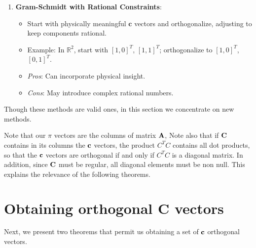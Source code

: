 \begin{enumerate}
\begin{itemize}
            \item \textit{Cons}: Exists only for specific $n - k$ (e.g., 2, 4, 8, \ldots).
        \end{itemize}
    \item \textbf{Gram-Schmidt with Rational Constraints}:
        \begin{itemize}
            \item Start with physically meaningful $\mathbf{c}$ vectors and orthogonalize, adjusting to keep components rational.
            \item Example: In $\mathbb{R}^2$, start with $[1, 0]^T$, $[1, 1]^T$; orthogonalize to $[1, 0]^T$, $[0, 1]^T$.
            \item \textit{Pros}: Can incorporate physical insight.
            \item \textit{Cons}: May introduce complex rational numbers.
        \end{itemize}
\end{enumerate}

Though these methods are valid ones, in this section we concentrate on new methods.

Note that our $\pi$ vectors are the columns of matrix ${\bf A}$, Note also that if ${\bf C}$ contains in its columns the ${\bf c}$ vectors, the product $C^T C$ contains all dot products, so that the ${\bf c}$ vectors are orthogonal if and only if $C^T C$ is a diagonal matrix. In addition, since ${\bf C}$
must be regular, all diagonal elements must be non null.  This explains the relevance of the following theorems.

\section{Obtaining orthogonal C vectors}
Next, we present two theorems that permit us obtaining a set of ${\bf c}$ orthogonal vectors.

